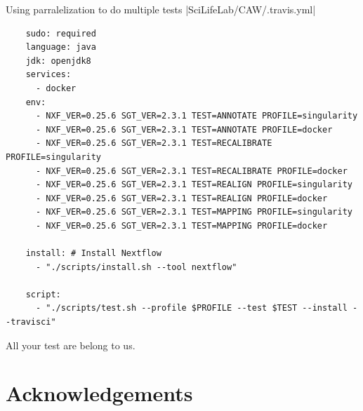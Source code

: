 \documentclass{beamer}
\begin{document}
\begin{frame}[fragile]{Using parralelization to do multiple tests}
|SciLifeLab/CAW/.travis.yml|
\begin{verbatim}
	sudo: required
	language: java
	jdk: openjdk8
	services:
	  - docker
	env:
	  - NXF_VER=0.25.6 SGT_VER=2.3.1 TEST=ANNOTATE PROFILE=singularity
	  - NXF_VER=0.25.6 SGT_VER=2.3.1 TEST=ANNOTATE PROFILE=docker
	  - NXF_VER=0.25.6 SGT_VER=2.3.1 TEST=RECALIBRATE PROFILE=singularity
	  - NXF_VER=0.25.6 SGT_VER=2.3.1 TEST=RECALIBRATE PROFILE=docker
	  - NXF_VER=0.25.6 SGT_VER=2.3.1 TEST=REALIGN PROFILE=singularity
	  - NXF_VER=0.25.6 SGT_VER=2.3.1 TEST=REALIGN PROFILE=docker
	  - NXF_VER=0.25.6 SGT_VER=2.3.1 TEST=MAPPING PROFILE=singularity
	  - NXF_VER=0.25.6 SGT_VER=2.3.1 TEST=MAPPING PROFILE=docker

	install: # Install Nextflow
	  - "./scripts/install.sh --tool nextflow"

	script:
	  - "./scripts/test.sh --profile $PROFILE --test $TEST --install --travisci"
\end{verbatim}
\end{frame}

\begin{frame}{All your test are belong to us.}
\end{frame}


\section{Acknowledgements}
\end{document}
